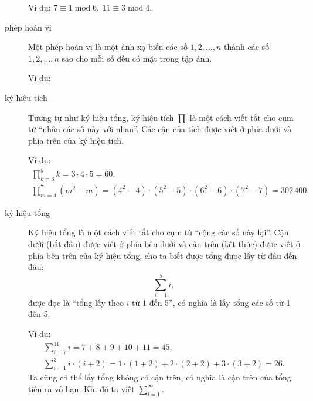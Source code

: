 \begin{description}
		Ví dụ: $7\equiv 1\operatorname{mod} 6,\ 11\equiv 3\operatorname{mod} 4$. 

	\item[phép hoán vị] Một phép hoán vị là một ánh xạ biến các số $1,2,\dots,n$ thành các số $1,2,\dots,n$ sao cho mỗi số đều có mặt trong tập ảnh. 

		Ví dụ:
		\begin{figure} 
			\def\svgwidth{200pt} 
			 
		\end{figure} 
	
	\item[ký hiệu tích] Tương tự như ký hiệu tổng, ký hiệu tích $\prod$ là một cách viết tắt cho cụm từ \enquote{nhân các số này với nhau}. Các cận của tích được viết ở phía dưới và phía trên của ký hiệu tích.

		Ví dụ: 
		\begin{gather*}
			\prod\limits_{k=3}^5 k = 3\cdot 4\cdot 5 = 60,\\
			\prod\limits_{m=4}^7 (m^2 - m) = (4^2-4)\cdot(5^2-5)\cdot (6^2-6) \cdot (7^2-7)= 302\,400.
		\end{gather*}
		\item[ký hiệu tổng] Ký hiệu tổng là một cách viết tắt cho cụm từ \enquote{cộng các số này lại}. Cận dưới (bắt đầu) được viết ở phía bên dưới và cận trên (kết thúc) được viết ở phía bên trên của ký hiệu tổng, cho ta biết được tổng được lấy từ đâu đến đâu:		
		\begin{equation*}
			\sum\limits_{i=1}^5 i,
		\end{equation*}
		được đọc là \enquote{tổng lấy theo $i$ từ 1 đến 5}, có nghĩa là lấy tổng các số từ 1 đến 5. 

		Ví dụ:
		\begin{gather*}
			\sum\limits_{i=7}^{11} i= 7+8+9+10+11 = 45,\\
			\sum\limits_{i=1}^3 i\cdot (i+2) = 1\cdot (1+2) + 2\cdot (2+2) + 3\cdot (3+2) = 26.
		\end{gather*}
		Ta cũng có thể lấy tổng không có cận trên, có nghĩa là cận trên của tổng tiến ra vô hạn. Khi đó ta viết $\sum\limits_{i=1}^\infty$. 
\end{description}

